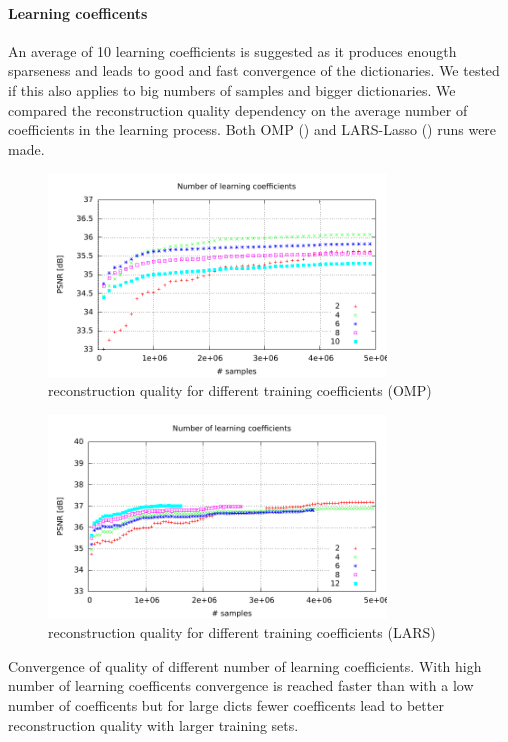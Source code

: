 \paragraph{Learning coefficents}
An average of 10 learning coefficients is suggested as it produces enougth
sparseness and leads to good and fast convergence of the dictionaries.
We tested if this also applies to big numbers of samples and bigger
dictionaries. We compared the reconstruction quality dependency on the average
number of coefficients in the learning process. Both OMP
() and LARS-Lasso () runs
were made.
\begin{figure}[h]
\centering
\includegraphics[width = 0.8\textwidth]{../tests/results/old/coeffsConverg.pdf}
\caption{reconstruction quality for different training coefficients (OMP)}
\label{fig:coeffsOMP}
\end{figure}
\begin{figure}[h]
\centering
\includegraphics[width = 0.8\textwidth]{../tests/results/coeffsConverg.pdf}
\caption{reconstruction quality for different training coefficients (LARS)}
\label{fig:coeffsLasso}
\end{figure}

Convergence of quality of different number of learning coefficients.
With high number of learning coefficents convergence is reached faster than
with a low number of coefficents but for large dicts fewer coefficents lead to
better reconstruction quality with larger training sets.

